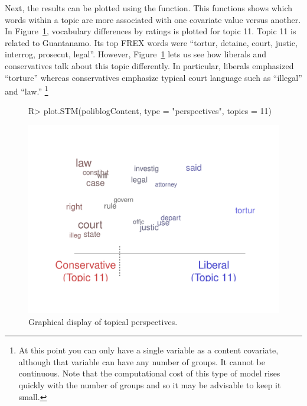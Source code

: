 \documentclass[article,shortnames]{jss}
\begin{document}
\begin{Schunk}
\end{Schunk}

Next, the results can be plotted using the  function.  This functions shows which words within a topic are more associated with one covariate value versus another. In Figure~\ref{fig:perp}, vocabulary differences by ratings is plotted for topic 11. Topic 11 is related to Guantanamo. Its top FREX words were ``tortur, detaine, court, justic, interrog, prosecut, legal''. However, Figure~\ref{fig:perp} lets us see how liberals and conservatives talk about this topic differently. In particular, liberals emphasized ``torture'' whereas conservatives emphasize typical court language such as ``illegal'' and ``law.'' \footnote{At this point you can only
 have a single variable as a content covariate, although that variable can have any number of groups. It cannot be continuous. Note that the computational cost of this type of model rises quickly with the number of groups and so it may be advisable to keep it small.}

\begin{figure}
\begin{center}
\begin{Schunk}
\begin{Sinput}
R> plot.STM(poliblogContent, type = "perspectives", topics = 11)
\end{Sinput}
\end{Schunk}
\includegraphics{stmVignette-020}
\caption{Graphical display of topical perspectives.}
\label{fig:perp}
\end{center}
\end{figure}
\end{document}
